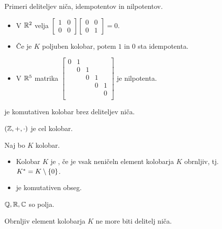 \begin{zgled}
    Primeri deliteljev niča, idempotentov in nilpotentov.
    \begin{itemize}
        \item V $\mathbb{R}^2$ velja $\begin{bmatrix}
            1 & 0 \\ 0 & 0
        \end{bmatrix} \begin{bmatrix}
            0 & 0 \\ 0 & 1
        \end{bmatrix} = 0$.
        \item Če je $K$ poljuben kolobar, potem $1$ in $0$ sta idempotenta.
        \item V $\mathbb{R}^5$ matrika $\begin{bmatrix}
            0 & 1 & & & \\ 
            & 0 & 1 & & \\ 
            & & 0 & 1 & \\ 
            & & & 0 & 1 \\ 
            & & &  & 0 \\ 
        \end{bmatrix}$ je nilpotenta.
    \end{itemize}
\end{zgled}

\begin{definicija}
     je komutativen kolobar brez deliteljev niča.
\end{definicija}

\begin{primer}
    $(\mathbb{Z}, +, \cdot)$ je cel kolobar.
\end{primer}

\begin{definicija}
    Naj bo $K$ kolobar.
    \begin{itemize}
        \item Kolobar $K$ je , če je vsak neničeln element kolobarja $K$ obrnljiv, tj. $K^* = K \setminus \left\{0\right\}$. 
        \item {} je komutativen obseg.
    \end{itemize}
\end{definicija}

\begin{primer}
    $\mathbb{Q}, \mathbb{R}, \mathbb{C}$ so polja.
\end{primer}

\begin{trditev}
    Obrnljiv element kolobarja $K$ ne more biti delitelj niča.
\end{trditev}

